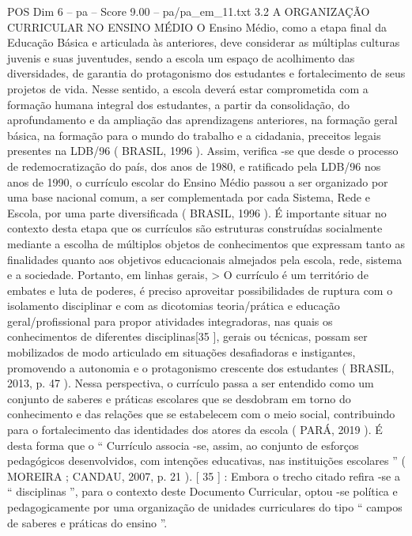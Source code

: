\begin{textsample}{POS Dim 6 – pa – Score 9.00 – pa/pa\_em\_11.txt}  \label{ex:f6_pos_069}
3.2 A ORGANIZAÇÃO CURRICULAR NO ENSINO MÉDIO O Ensino Médio, como a etapa final da Educação Básica e articulada às anteriores, deve considerar as múltiplas culturas juvenis e suas juventudes, sendo a escola um espaço de acolhimento das diversidades, de garantia do protagonismo dos estudantes e fortalecimento de seus projetos de vida.
Nesse sentido, a escola deverá estar comprometida com a formação humana integral dos estudantes, a partir da consolidação, do aprofundamento e da ampliação das aprendizagens anteriores, na formação geral básica, na formação para o mundo do trabalho e a cidadania, preceitos legais presentes na LDB/96 ( BRASIL, 1996 ).
Assim, verifica -se que desde o processo de redemocratização do país, dos anos de 1980, e ratificado pela LDB/96 nos anos de 1990, o currículo escolar do Ensino Médio passou a ser organizado por uma base nacional comum, a ser complementada por cada Sistema, Rede e Escola, por uma parte diversificada ( BRASIL, 1996 ).
É importante situar no contexto desta etapa que os currículos são estruturas construídas socialmente mediante a escolha de múltiplos objetos de conhecimentos que expressam tanto as finalidades quanto aos objetivos educacionais almejados pela escola, rede, sistema e a sociedade.
Portanto, em linhas gerais, > O currículo é um território de embates e luta de poderes, é preciso aproveitar possibilidades de ruptura com o isolamento disciplinar e com as dicotomias teoria/prática e educação geral/profissional para propor atividades integradoras, nas quais os conhecimentos de diferentes disciplinas[35 ], gerais ou técnicas, possam ser mobilizados de modo articulado em situações desafiadoras e instigantes, promovendo a autonomia e o protagonismo crescente dos estudantes ( BRASIL, 2013, p. 47 ).
Nessa perspectiva, o currículo passa a ser entendido como um conjunto de saberes e práticas escolares que se desdobram em torno do conhecimento e das relações que se estabelecem com o meio social, contribuindo para o fortalecimento das identidades dos atores da escola ( PARÁ, 2019 ).
É desta forma que o “ Currículo associa -se, assim, ao conjunto de esforços pedagógicos desenvolvidos, com intenções educativas, nas instituições escolares ” ( MOREIRA ; CANDAU, 2007, p. 21 ). [ 35 ] : Embora o trecho citado refira -se a “ disciplinas ”, para o contexto deste Documento Curricular, optou -se política e pedagogicamente por uma organização de unidades curriculares do tipo “ campos de saberes e práticas do ensino ”.

\end{textsample}

